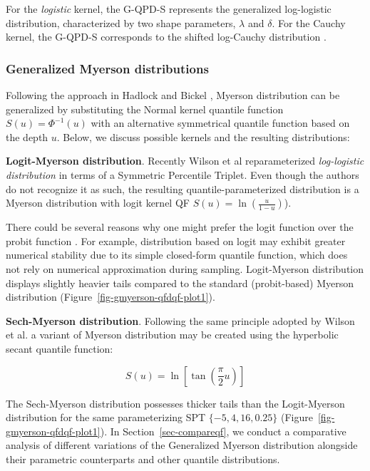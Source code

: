 \documentclass[
  fleqn,
  deca,
  blindrev
]{informs4}
\begin{document}
For the \emph{logistic} kernel, the G-QPD-S represents the generalized
log-logistic distribution, characterized by two shape parameters,
\(\lambda\) and \(\delta\). For the Cauchy kernel, the G-QPD-S
corresponds to the shifted log-Cauchy distribution
\citep{hadlock2019GeneralizedJohnsonQuantileParameterized}.

\subsubsection{Generalized Myerson distributions}\label{sec-genmyerson}

Following the approach in Hadlock and Bickel
\citep{hadlock2019GeneralizedJohnsonQuantileParameterized}, Myerson
distribution can be generalized by substituting the Normal kernel
quantile function \(S(u)=\Phi^{-1}(u)\) with an alternative symmetrical
quantile function based on the depth \(u\). Below, we discuss possible
kernels and the resulting distributions:

\textbf{Logit-Myerson distribution}. Recently Wilson et al
\citep{wilson2023ReconciliationExpertPriors} reparameterized
\emph{log-logistic distribution} in terms of a Symmetric Percentile
Triplet. Even though the authors do not recognize it as such, the
resulting quantile-parameterized distribution is a Myerson distribution
with logit kernel QF \(S(u)=\ln\left(\frac{u}{1-u}\right)\)).

There could be several reasons why one might prefer the logit function
over the probit function \citep{berkson1951WhyPreferLogits}. For
example, distribution based on logit may exhibit greater numerical
stability due to its simple closed-form quantile function, which does
not rely on numerical approximation during sampling. Logit-Myerson
distribution displays slightly heavier tails compared to the standard
(probit-based) Myerson distribution
(Figure~\ref{fig-gmyerson-qfdqf-plot1}).

\textbf{Sech-Myerson distribution}. Following the same principle adopted
by Wilson et al. \citep{wilson2023ReconciliationExpertPriors} a variant
of Myerson distribution may be created using the hyperbolic secant
quantile function:

\[
S(u)=\ln\left[\tan\left(\frac{\pi}{2}u\right)\right]
\]

The Sech-Myerson distribution possesses thicker tails than the
Logit-Myerson distribution for the same parameterizing SPT
\(\{-5,4,16, 0.25\}\) (Figure~\ref{fig-gmyerson-qfdqf-plot1}). In
Section~\ref{sec-compareqf}, we conduct a comparative analysis of
different variations of the Generalized Myerson distribution alongside
their parametric counterparts and other quantile distributions.
\end{document}
